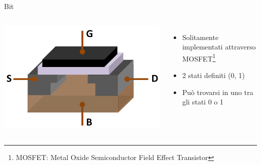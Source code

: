 \documentclass{beamer}
\begin{document}
    \begin{frame}{Bit}
        \begin{columns}
            \includegraphics[width=\textwidth]{gfx/MOSFET_Structure.png}
            \begin{itemize}
                \item Solitamente implementati attraverso MOSFET\footnote{MOSFET: Metal Oxide Semiconductor Field Effect Transistor}
                \item 2 stati definiti (0, 1)
                \item Può trovarsi in uno tra gli stati 0 o 1
            \end{itemize}
        \end{columns}
    \end{frame}
\end{document}
